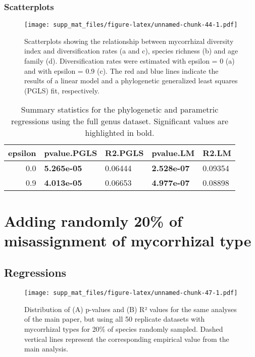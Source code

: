 \documentclass[]{article}
\begin{document}
\hypertarget{scatterplots-2}{%
\subsubsection{Scatterplots}\label{scatterplots-2}}

\begin{figure}
\centering
\texttt{[image: supp\_mat\_files/figure-latex/unnamed-chunk-44-1.pdf]}
\caption{Scatterplots showing the relationship between mycorrhizal
diversity index and diversification rates (a and c), species richness
(b) and age family (d). Diversification rates were estimated with
epsilon = 0 (a) and with epsilon = 0.9 (c). The red and blue lines
indicate the results of a linear model and a phylogenetic generalized
least squares (PGLS) fit, respectively.}
\end{figure}

\begin{table}[H]

\caption{\label{tab:unnamed-chunk-45}Summary statistics for the phylogenetic and parametric regressions using the full genus dataset. Significant values are highlighted in bold.}
\centering
\begin{tabular}{r|l|l|l|l}
\hline
epsilon & pvalue.PGLS & R2.PGLS & pvalue.LM & R2.LM\\
\hline
0.0 & \textbf{5.265e-05} & 0.06444 & \textbf{2.528e-07} & 0.09354\\
\hline
0.9 & \textbf{4.013e-05} & 0.06653 & \textbf{4.977e-07} & 0.08898\\
\hline
\end{tabular}
\end{table}

\hypertarget{adding-randomly-20-of-misassignment-of-mycorrhizal-type}{%
\section{Adding randomly 20\% of misassignment of mycorrhizal
type}\label{adding-randomly-20-of-misassignment-of-mycorrhizal-type}}

\hypertarget{regressions}{%
\subsection{Regressions}\label{regressions}}

\begin{figure}
\centering
\texttt{[image: supp\_mat\_files/figure-latex/unnamed-chunk-47-1.pdf]}
\caption{Distribution of (A) p-values and (B) R² values for the same
analyses of the main paper, but using all 50 replicate datasets with
mycorrhizal types for 20\% of species randomly sampled. Dashed vertical
lines represent the corresponding empirical value from the main
analysis.}
\end{figure}
\end{document}
